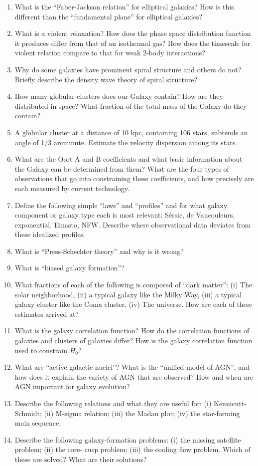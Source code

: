 \documentclass[11pt, oneside]{book}
\begin{document}
\begin{enumerate}[start=100, itemsep=0.4cm]
    \item What is the ``Faber-Jackson relation'' for elliptical galaxies? How is this different than the ``fundamental plane'' for elliptical galaxies?
    \item What is a violent relaxation? How does the phase space distribution function it produces differ from that of an isothermal gas? How does the timescale for violent relation compare to that for weak 2-body interactions?
    \item Why do some galaxies have prominent spiral structure and others do not? Briefly describe the density wave theory of spiral structure?
    \item How many globular clusters does our Galaxy contain? How are they distributed in space? What fraction of the total mass of the Galaxy do they contain?
    \item A globular cluster at a distance of 10 kpc, containing 106 stars, subtends an angle of 1/3 arcminute. Estimate the velocity dispersion among its stars.
    \item What are the Oort A and B coefficients and what basic information about the Galaxy can be determined from them? What are the four types of observations that go into constraining these coefficients, and how precisely are each measured by current technology.
    \item Define the following simple ``laws'' and ``profiles'' and for what galaxy component or galaxy type each is most relevant: Sérsic, de Vaucouleurs, exponential, Einasto, NFW. Describe where observational data deviates from these idealized profiles.
    \item What is ``Press-Schechter theory'' and why is it wrong?
    \item What is ``biased galaxy formation''?
    \item What fractions of each of the following is composed of ``dark matter'': (i) The solar neighborhood, (ii) a typical galaxy like the Milky Way, (iii) a typical galaxy cluster like the Coma cluster, (iv) The universe. How are each of these estimates arrived at?
    \item What is the galaxy correlation function? How do the correlation functions of galaxies and clusters of galaxies differ? How is the galaxy correlation function used to constrain $H_{0}$?
    \item What are ``active galactic nuclei''? What is the ``unified model of AGN'', and how does it explain the variety of AGN that are observed? How and when are AGN important for galaxy evolution?
    \item Describe the following relations and what they are useful for: (i) Kennicutt-Schmidt; (ii) M-sigma relation; (iii) the Madau plot; (iv) the star-forming main sequence.
    \item Describe the following galaxy-formation problems: (i) the missing satellite problem; (ii) the core- cusp problem; (iii) the cooling flow problem. Which of these are solved? What are their solutions?
\end{enumerate}
\end{document}
